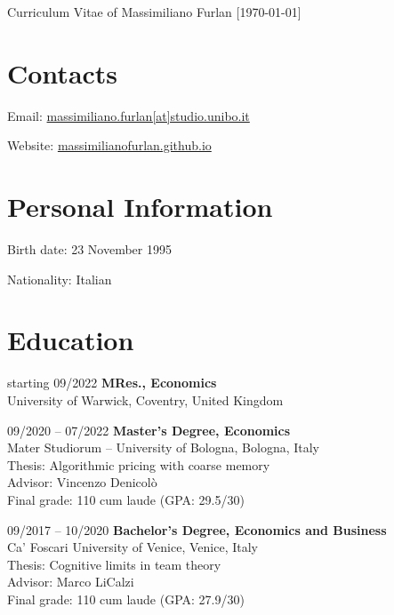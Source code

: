 \documentclass[11pt,a4paper]{article}
\begin{document}
\date{}
\thispagestyle{empty}
\setlength\cvlabelwidth{90pt}

\begin{cv}{\huge Curriculum Vitae of Massimiliano Furlan \normalsize{[\today]}} %

\section{Contacts}

\begin{cvlist}{}
	\itemsep -4pt
	\item[Email:] \href{mailto:massimiliano.furlan[at]studio.unibo.it}{massimiliano.furlan[at]studio.unibo.it}
	\item[Website:] \href{https://massimilianofurlan.github.io}{massimilianofurlan.github.io}
\end{cvlist}
\vspace{-20pt}

\section{Personal Information}

\begin{cvlist}{}
	\itemsep -4pt
	\item[Birth date:] 23 November 1995
	\item[Nationality:] Italian
\end{cvlist}
\vspace{-20pt}

\section{Education}

\begin{cvlist}{}
	\item[starting 09/2022] 
		\textbf{MRes., Economics}\\ 
		University of Warwick, Coventry, United Kingdom
	\item[09/2020 -- 07/2022] 
		\textbf{Master's Degree, Economics}\\ 
		 Mater Studiorum -- University of Bologna, Bologna, Italy\\
		Thesis: Algorithmic pricing with coarse memory\\
		Advisor: Vincenzo Denicolò\\
		Final grade: 110 cum laude \quad (GPA: 29.5/30)
	\item[09/2017 -- 10/2020] 
		\textbf{Bachelor's Degree, Economics and Business}\\
		Ca' Foscari University of Venice, Venice, Italy\\
		Thesis: Cognitive limits in team theory\\
		Advisor: Marco LiCalzi\\
		Final grade: 110 cum laude \quad (GPA: 27.9/30)	
\end{cvlist}
\vspace{-20pt}


\end{cv}
\end{document}
